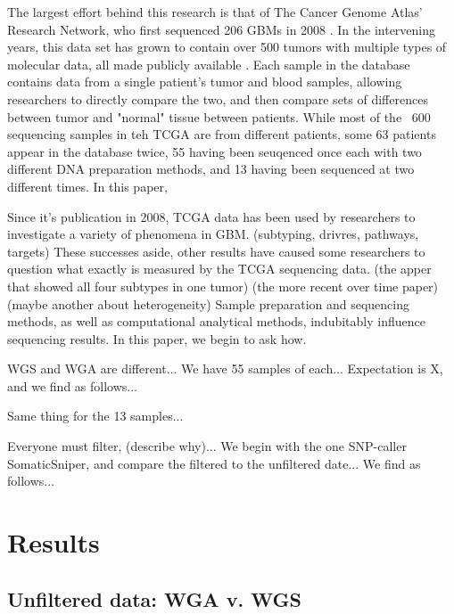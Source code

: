 \documentclass[11pt]{article} %
\begin{document}
 The largest effort behind this research is that of The Cancer Genome Atlas' Research Network, who first sequenced 206 GBMs in 2008 \cite{TCGA-GBM}. In the intervening years, this data set has grown to contain over 500 tumors with multiple types of molecular data, all made publicly available \cite{TCGA-GBM-13}. Each sample in the database contains data from a single patient's tumor and blood samples, allowing researchers to directly compare the two, and then compare sets of differences between tumor and "normal" tissue between patients.  While most of the ~600 sequencing samples in teh TCGA are from different patients, some 63 patients appear in the database twice, 55 having been seuqenced once each with two different DNA preparation methods, and 13 having been sequenced at two different times. In this paper,

Since it's publication in 2008, TCGA data has been used by researchers to investigate a variety of phenomena in GBM. (subtyping, drivres, pathways, targets) These successes aside, other results have caused some researchers to question what exactly is measured by the TCGA sequencing data. (the apper that showed all four subtypes in one tumor) (the more recent over time paper) (maybe another about heterogeneity) Sample preparation and sequencing methods, as well as computational analytical methods, indubitably influence sequencing results. In this paper, we begin to ask how.

WGS and WGA are different... We have 55 samples of each... Expectation is X, and we find as follows...

Same thing for the 13 samples...

Everyone must filter, (describe why)... We begin with the one SNP-caller SomaticSniper, and compare the filtered to the unfiltered date... We find as follows...

\section{Results}

\subsection{Unfiltered data: WGA v. WGS}
\end{document}
